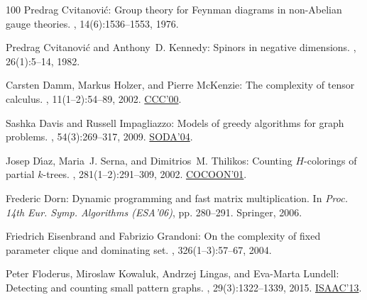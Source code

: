 \begin{thebibliography}{100}
{\sc Predrag {Cvitanovi\'c}}: Group theory for {F}eynman diagrams in
  non-{A}belian gauge theories.
, 14(6):1536--1553, 1976.

{\sc Predrag {Cvitanovi\'c} and Anthony~D. Kennedy}: Spinors in negative
  dimensions.
, 26(1):5--14, 1982.
\newblock [\epfmtdoi{10.1088/0031-8949/26/1/001}]

{\sc Carsten Damm, Markus Holzer, and Pierre McKenzie}: The complexity of
  tensor calculus.
, 11(1--2):54--89, 2002.
\newblock \prelim \href{https://doi.org/10.1109/CCC.2000.856737}{CCC'00}.

{\sc Sashka Davis and Russell Impagliazzo}: Models of greedy algorithms for
  graph problems.
, 54(3):269--317, 2009.
\newblock \prelim \href{https://dl.acm.org/doi/10.5555/982792.982847}{SODA'04}.

{\sc Josep D{\'{\i}}az, Maria~J. Serna, and Dimitrios~M. Thilikos}: Counting
  {$H$}-colorings of partial $k$-trees.
, 281(1--2):291--309, 2002.
\newblock \prelim \href{https://doi.org/10.1007/3-540-44679-6\_33}{COCOON'01}.
\newblock [\epfmtdoi{10.1016/S0304-3975(02)00017-8}]

{\sc Frederic Dorn}: Dynamic programming and fast matrix multiplication.
\newblock In {\em Proc. 14th Eur. Symp. Algorithms (ESA'06)}, pp. 280--291.
  Springer, 2006.
\newblock [\epfmtdoi{10.1007/11841036\_27}]

{\sc Friedrich Eisenbrand and Fabrizio Grandoni}: On the complexity of fixed
  parameter clique and dominating set.
, 326(1--3):57--67, 2004.

{\sc Peter Floderus, Miroslaw Kowaluk, Andrzej Lingas, and Eva{-}Marta
  Lundell}: Detecting and counting small pattern graphs.
, 29(3):1322--1339, 2015.
\newblock \prelim
  \href{https://doi.org/10.1007/978-3-642-45030-3\_51}{ISAAC'13}.
\newblock [\epfmtdoi{10.1137/140978211}]


\end{thebibliography}
